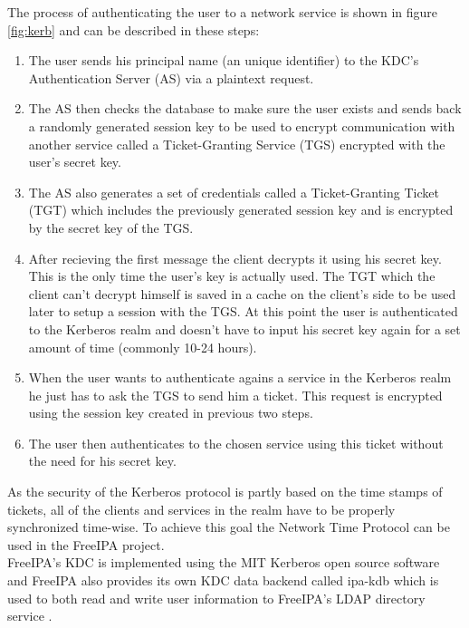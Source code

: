 The process of authenticating the user to a network service is shown in figure \ref{fig:kerb} and can be described in these steps:
\begin{enumerate}
    \item The user sends his principal name (an unique identifier) to the KDC's Authentication Server (AS) via a plaintext request.
    \item The AS then checks the database to make sure the user exists and sends back a randomly generated session key to be used to encrypt communication with another service called a Ticket-Granting Service (TGS) encrypted with the user's secret key.
    \item The AS also generates a set of credentials called a Ticket-Granting Ticket (TGT) which includes the previously generated session key and is encrypted by the secret key of the TGS.
    \item After recieving the first message the client decrypts it using his secret key. This is the only time the user's key is actually used. The TGT which the client can't decrypt himself is saved in a cache on the client's side to be used later to setup a session with the TGS. At this point the user is authenticated to the Kerberos realm and doesn't have to input his secret key again for a set amount of time (commonly 10-24 hours).
    \item When the user wants to authenticate agains a service in the Kerberos realm he just has to ask the TGS to send him a ticket. This request is encrypted using the session key created in previous two steps.
    \item The user then authenticates to the chosen service using this ticket without the need for his secret key.
\end{enumerate}

As the security of the Kerberos protocol is partly based on the time stamps of tickets, all of the clients and services in the realm have to be properly synchronized time-wise.
To achieve this goal the Network Time Protocol can be used in the FreeIPA project. \\
FreeIPA's KDC is implemented using the MIT Kerberos \cite{kerbWeb} open source software and FreeIPA also provides its own KDC data backend called ipa-kdb which is used to both read and write user information to FreeIPA's LDAP directory service \cite{kerbIpa}.

